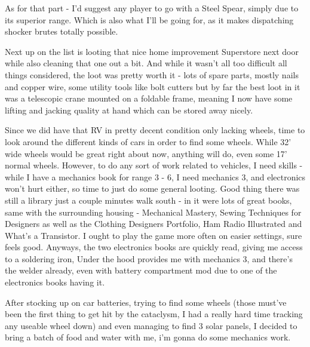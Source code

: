\documentclass[11pt]{report}
\begin{document}
As for that part - I'd suggest any player to go with a Steel Spear, simply due to its superior range. Which is also what I'll be going for, as it makes dispatching shocker brutes totally possible.

Next up on the list is looting that nice home improvement Superstore next door while also cleaning that one out a bit.
And while it wasn't all too difficult all things considered, the loot was pretty worth it - lots of spare parts, mostly nails and copper wire, some utility tools like bolt cutters but by far the best loot in it was a telescopic crane mounted on a foldable frame, meaning I now have some lifting and jacking quality at hand which can be stored away nicely.

Since we did have that RV in pretty decent condition only lacking wheels, time to look around the different kinds of cars in order to find some wheels. While 32' wide wheels would be great right about now, anything will do, even some 17' normal wheels. However, to do any sort of work related to vehicles, I need skills - while I have a mechanics book for range 3 - 6, I need mechanics 3, and electronics won't hurt either, so time to just do some general looting.
Good thing there was still a library just a couple minutes walk south - in it were lots of great books, same with the surrounding housing - Mechanical Mastery, Sewing Techniques for Designers as well as the Clothing Designers Portfolio, Ham Radio Illustrated and What's a Transistor. I ought to play the game more often on easier settings, sure feels good.
Anyways, the two electronics books are quickly read, giving me access to a soldering iron, Under the hood provides me with mechanics 3, and there's the welder already, even with battery compartment mod due to one of the electronics books having it.

After stocking up on car batteries, trying to find some wheels (those must've been the first thing to get hit by the cataclysm, I had a really hard time tracking any useable wheel down) and even managing to find 3 solar panels, I decided to bring a batch of food and water with me, i'm gonna do some mechanics work.
\end{document}
